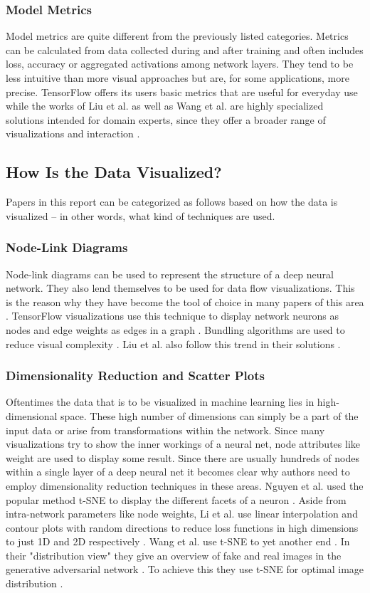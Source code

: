 \documentclass{acmsiggraph}               %
\begin{document}
\subsubsection{Model Metrics}
Model metrics are quite different from the previously listed categories. Metrics can be calculated from data collected during and after training and often includes loss, accuracy or aggregated activations among network layers. They tend to be less intuitive than more visual approaches but are, for some applications, more precise. TensorFlow \cite{Wongsuphasawat2018} offers its users basic metrics that are useful for everyday use while the works of Liu et al. as well as Wang et al. are highly specialized solutions intended for domain experts, since they offer a broader range of visualizations and interaction \cite{Liu2016,Liu2018,Wang}.

\subsection{How Is the Data Visualized?}
Papers in this report can be categorized as follows based on how the data is visualized -- in other words, what kind of techniques are used.
\subsubsection{Node-Link Diagrams}
Node-link diagrams can be used to represent the structure of a deep neural network. They also lend themselves to be used for data flow visualizations. This is the reason why they have become the tool of choice in many papers of this area \cite{Hohman2018}. TensorFlow visualizations use this technique to display network neurons as nodes and edge weights as edges in a graph \cite{Wongsuphasawat2018}. Bundling algorithms are used to reduce visual complexity \cite{Hohman2018,Wongsuphasawat2018}. Liu et al. also follow this trend in their solutions \cite{Liu2016,Liu2018}.
\subsubsection{Dimensionality Reduction and Scatter Plots}
Oftentimes the data that is to be visualized in machine learning lies in high-dimensional space. These high number of dimensions can simply be a part of the input data or arise from transformations within the network. Since many visualizations try to show the inner workings of a neural net, node attributes like weight are used to display some result. Since there are usually hundreds of nodes within a single layer of a deep neural net it becomes clear why authors need to employ dimensionality reduction techniques in these areas.
Nguyen et al. used the popular method t-SNE to display the different facets of a neuron \cite{Nguyen2016}. 
Aside from intra-network parameters like node weights, Li et al. use linear interpolation and contour plots with random directions to reduce loss functions in high dimensions to just 1D and 2D respectively \cite{Li2017}.
Wang et al. use t-SNE to yet another end \cite{Wang}. In their "distribution view" they give an overview of fake and real images in the generative adversarial network \cite{Wang}. To achieve this they use t-SNE for optimal image distribution \cite{Wang}. 
\end{document}
